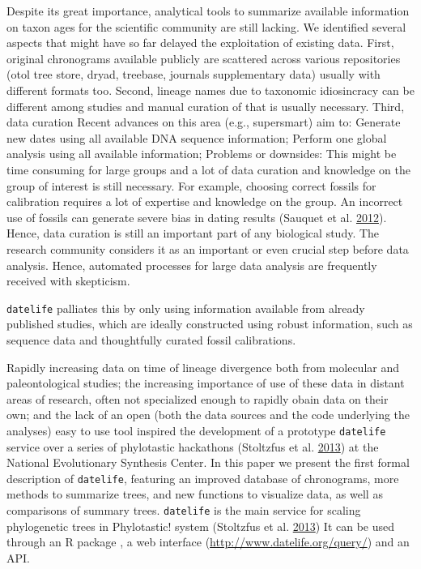 \documentclass[]{article}
\begin{document}
Despite its great importance, analytical tools to summarize available information
on taxon ages for the scientific community are still lacking.
We identified several aspects that might have so far delayed the exploitation of
existing data. First, original chronograms available publicly are scattered across
various repositories (otol tree store, dryad, treebase, journals supplementary data)
usually with different formats too.
Second, lineage names due to taxonomic idiosincracy can be different among studies
and manual curation of that is usually necessary.
Third, data curation
Recent advances on this area (e.g., supersmart) aim to:
Generate new dates using all available DNA sequence information;
Perform one global analysis using all available information;
Problems or downsides: This might be time consuming for large groups and a lot of
data curation and knowledge on the group of interest is still necessary. For example,
choosing correct fossils for calibration
requires a lot of expertise and knowledge on the group. An incorrect use of fossils
can generate severe bias in dating results (Sauquet et al. \protect\hyperlink{ref-Sauquet2012c}{2012}).
Hence, data curation is still an important part of any biological study. The research
community considers it as an important or even crucial step before data analysis.
Hence, automated processes for large data analysis are frequently received with skepticism.

\texttt{datelife} palliates this by only using information available from already published
studies, which are ideally constructed using robust information, such as sequence
data and thoughtfully curated fossil calibrations.

Rapidly increasing data on time of lineage divergence both from molecular and paleontological studies; the increasing importance of use of these data in distant areas of research, often not specialized enough to rapidly obain data on their own; and the lack of an open (both the data sources and the code underlying the analyses) easy to use tool
inspired the development of a prototype \texttt{datelife} service over a series
of phylotastic hackathons (Stoltzfus et al. \protect\hyperlink{ref-Stoltzfus2013}{2013}) at the National Evolutionary Synthesis Center.
In this paper we present the first formal description of \texttt{datelife}, featuring an improved database of chronograms, more methods to summarize trees, and new functions to visualize data, as well as comparisons of summary trees.
\texttt{datelife} is the main service for scaling phylogenetic trees in Phylotastic! system
(Stoltzfus et al. \protect\hyperlink{ref-Stoltzfus2013}{2013})
It can be used through an R package , a web interface
(\url{http://www.datelife.org/query/}) and an API.
\end{document}
